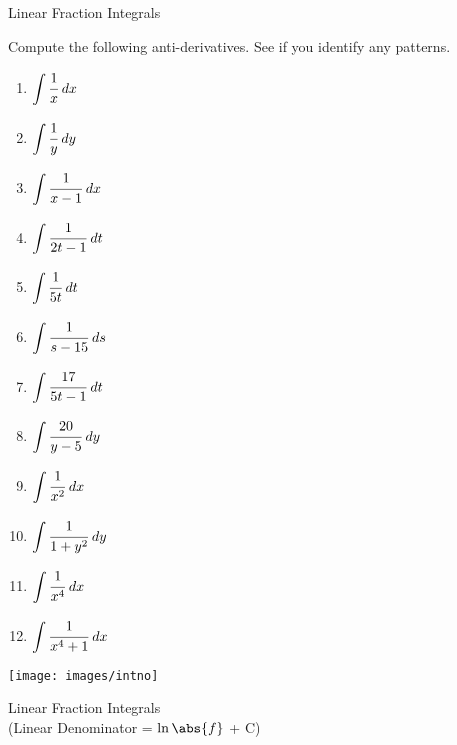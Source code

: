 \documentclass[12pt, letterpaper]{report}
\newcommand{\0}{\emptyset}
\theoremstyle{theorem}
\theoremstyle{definition}
\theoremstyle{definition}
\theoremstyle{definition}
\theoremstyle{definition}
\theoremstyle{theorem}
\theoremstyle{theorem}
\theoremstyle{remark}
\begin{document}
\begin{center}
\Large Linear Fraction Integrals \\
\end{center}

Compute the following anti-derivatives.  See if you identify any patterns.
\begin{multicols}{3}
\bfseries{\begin{Large}
	\begin{enumerate}
		\item $\displaystyle\int \cfrac{1}{x}\; dx$
		\vspace{3.5cm}
		\item $\displaystyle\int \cfrac{1}{y}\; dy$
		\vspace{3.5cm}
		\item $\displaystyle\int \cfrac{1}{x-1}\; dx$
		\vspace{3.5cm}
		\item $\displaystyle\int \cfrac{1}{2t-1}\; dt$
		\vspace{3.5cm}
		\item $\displaystyle\int \cfrac{1}{5t}\; dt$
		\vspace{3.5cm}
		\item $\displaystyle\int \cfrac{1}{s-15}\; ds$
		\vspace{3.5cm}
		\item $\displaystyle\int \cfrac{17}{5t-1}\; dt$
		\vspace{3.5cm}
		\item $\displaystyle\int \cfrac{20}{y-5}\; dy$
		\vspace{3.5cm}
		\item $\displaystyle\int \cfrac{1}{x^2}\; dx$
		\vspace{3.5cm}
		\item $\displaystyle\int \cfrac{1}{1+y^2}\; dy$
		\vspace{3.5cm}
		\item $\displaystyle\int \cfrac{1}{x^4}\; dx$
		\vspace{3.5cm}
		\item $\displaystyle\int \cfrac{1}{x^4+1}\; dx$
	\end{enumerate}
\end{Large}}

\end{multicols}

\texttt{[image: images/intno]}

\newpage
\begin{center}
\Large Linear Fraction Integrals \\ (Linear Denominator = $\ln \abs{f}$ + C)
\end{center}
\end{document}
